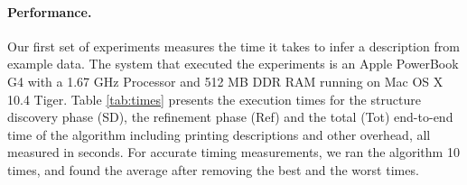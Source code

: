 
\paragraph*{Performance.}
Our first set of experiments measures the time it takes to infer a description
from example data.  The system that executed the experiments is an 
Apple PowerBook G4 with a 1.67 GHz Processor and 512 MB DDR RAM 
running on Mac OS X 10.4 Tiger. Table \ref{tab:times} presents the execution times
for the structure discovery phase (SD), the refinement phase (Ref) and the
total (Tot) end-to-end time of the algorithm including printing \pads{} descriptions and other 
overhead, all measured in seconds.  For accurate timing measurements, we ran the algorithm
10 times, and found the average after removing the best and the worst times.

